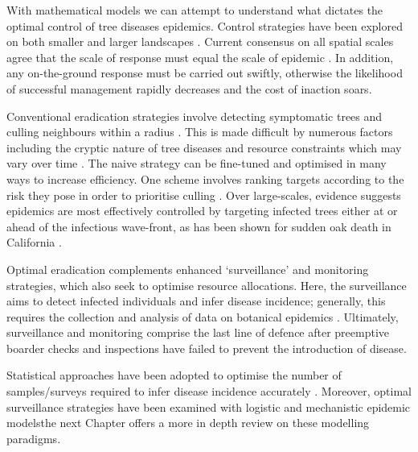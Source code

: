 With mathematical models we can attempt to understand what dictates the optimal control of tree diseases epidemics. 
Control strategies have been explored on both smaller \cite{risk-potential-control} 
and larger landscapes \cite{large-scale-control2}. Current consensus on all spatial scales
agree that the scale of response must equal the scale of epidemic \cite{control-scale-matching}. In addition, 
any on-the-ground response must be carried out swiftly, otherwise the likelihood of successful management rapidly decreases and the cost of inaction soars.

Conventional eradication strategies involve detecting symptomatic trees and culling neighbours within a radius \cite{WEBIDEMICS}.
This is made difficult by numerous factors including the cryptic nature of tree diseases and resource constraints which may vary
over time \cite{control-theory, control-theory-application}. The naive strategy can be fine-tuned and optimised in many ways to increase
efficiency. One scheme involves ranking targets according to the risk they pose in order to prioritise culling \cite{risk-potential-control}.
Over large-scales, evidence suggests epidemics are most effectively controlled by targeting infected trees either at or ahead of
the infectious wave-front, as has been shown for sudden oak death in California \cite{large-scale-control}.


Optimal eradication complements enhanced `surveillance' and monitoring strategies, 
which also seek to optimise resource allocations. Here, the surveillance aims to detect infected individuals and infer disease incidence;
generally, this requires the collection and analysis of data on botanical epidemics \cite{surveillance-review}.
Ultimately, surveillance and monitoring comprise the last line of defence after preemptive boarder 
checks and inspections have failed to prevent the introduction of disease. 

Statistical approaches have been adopted to optimise the number of samples/surveys required to infer disease incidence accurately \cite{yamamura2016sampling}.
Moreover, optimal surveillance strategies have been examined with logistic \cite{parnell2012estimating} 
and mechanistic \cite{WEBIDEMICS} epidemic models\textemdash the next Chapter offers a more in depth review on these modelling paradigms.

